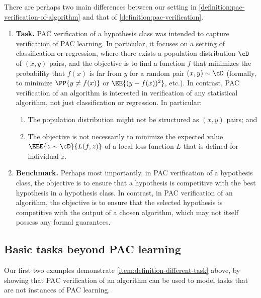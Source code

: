 \documentclass[11pt]{article}
\begin{document}
There are perhaps two main differences between our setting in \cref{definition:pac-verification-of-algorithm} and that of \cref{definition:pac-verification}. 
\begin{enumerate}
	\item{
		\label{item:definition-different-task}
		\textbf{Task.} PAC verification of a hypothesis class was intended to capture verification of PAC learning. In particular, it focuses on a setting of classification or regression, where there exists a population distribution $\cD$ of $(x,y)$ pairs, and the objective is to find a function $f$ that minimizes the probability that $f(x)$ is far from $y$ for a random pair $(x,y) \sim \cD$ (formally, to minimize $\PP{y \neq f(x)}$ or $\EE{(y-f(x))^2}$, etc.). 
		In contrast, PAC verification of an algorithm is interested in verification of any statistical algorithm, not just classification or regression. In particular:
		\begin{enumerate}
			\item{
				\label{item:population-not-x-y}
				The population distribution might not be structured as $(x,y)$ pairs; and
			}
			\item{
				\label{item:objective-not-local-expectation}
				The objective is not necessarily to minimize the expected value $\EEE{z \sim \cD}{L(f, z)}$ of a local loss function $L$ that is defined for individual $z$.
			}
		\end{enumerate}
	}
	\item{
		\label{item:definition-different-benchmark}
		\textbf{Benchmark.} Perhaps most importantly, in PAC verification of a hypothesis class, the objective is to ensure that a hypothesis is competitive with the best hypothesis in a hypothesis class. In contrast, in PAC verification of an algorithm, the objective is to ensure that the selected hypothesis is competitive with the output of a chosen algorithm, which may not itself possess any formal guarantees.
	}
\end{enumerate}


\subsection{Basic tasks beyond PAC learning}


Our first two examples demonstrate \cref{item:definition-different-task} above, by showing that PAC verification of an algorithm can be used to model tasks that are not instances of PAC learning.
\end{document}
